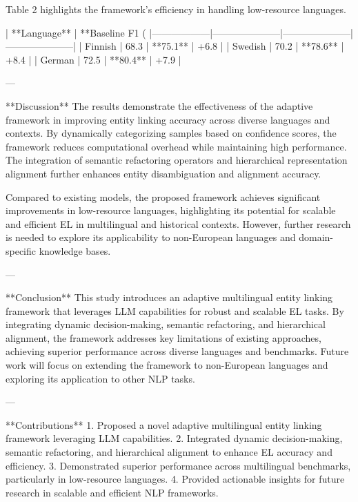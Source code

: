 Table 2 highlights the framework's efficiency in handling low-resource languages.  

| **Language**    | **Baseline F1 (%
|------------------|---------------------|---------------------|---------------------|  
| Finnish         | 68.3                | **75.1**            | +6.8                |  
| Swedish         | 70.2                | **78.6**            | +8.4                |  
| German          | 72.5                | **80.4**            | +7.9                |  

---

**Discussion**  
The results demonstrate the effectiveness of the adaptive framework in improving entity linking accuracy across diverse languages and contexts. By dynamically categorizing samples based on confidence scores, the framework reduces computational overhead while maintaining high performance. The integration of semantic refactoring operators and hierarchical representation alignment further enhances entity disambiguation and alignment accuracy.

Compared to existing models, the proposed framework achieves significant improvements in low-resource languages, highlighting its potential for scalable and efficient EL in multilingual and historical contexts. However, further research is needed to explore its applicability to non-European languages and domain-specific knowledge bases.

---

**Conclusion**  
This study introduces an adaptive multilingual entity linking framework that leverages LLM capabilities for robust and scalable EL tasks. By integrating dynamic decision-making, semantic refactoring, and hierarchical alignment, the framework addresses key limitations of existing approaches, achieving superior performance across diverse languages and benchmarks. Future work will focus on extending the framework to non-European languages and exploring its application to other NLP tasks.

---

**Contributions**  
1. Proposed a novel adaptive multilingual entity linking framework leveraging LLM capabilities.  
2. Integrated dynamic decision-making, semantic refactoring, and hierarchical alignment to enhance EL accuracy and efficiency.  
3. Demonstrated superior performance across multilingual benchmarks, particularly in low-resource languages.  
4. Provided actionable insights for future research in scalable and efficient NLP frameworks.  